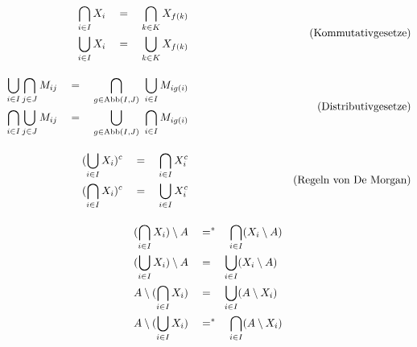 \begin{align*}
    \begin{split}
        \bigcap_{i\in I} X_i & \quad =\quad \bigcap_{k\in K} X_{f(k)} \\
        \bigcup_{i\in I} X_i & \quad =\quad \bigcup_{k\in K} X_{f(k)}
    \end{split} && (\text{Kommutativgesetze}) \\[1em]
    \begin{split}
        \bigcup_{i \in I} \bigcap_{j \in J} M_{ij} & \quad =\quad \bigcap_{g \in \Abb(I,J)}\ \bigcup_{i \in I} M_{ig(i)} \\ %
        \bigcap_{i \in I} \bigcup_{j \in J} M_{ij} & \quad =\quad \bigcup_{g \in \Abb(I,J)}\ \bigcap_{i \in I} M_{ig(i)} %
    \end{split} && (\text{Distributivgesetze}) \\[1em]
    \begin{split}
    (\bigcup_{i\in I} X_i)^c & \quad =\quad \bigcap_{i\in I} X_i^c \\
    (\bigcap_{i\in I} X_i)^c & \quad =\quad \bigcup_{i\in I} X_i^c
    \end{split} && (\text{Regeln von De Morgan}) \\[1em]
    (\bigcap_{i\in I} X_i) \setminus A & \quad =^* \quad \bigcap_{i\in I} (X_i \setminus A)  \\
    (\bigcup_{i\in I} X_i) \setminus A & \quad =\quad \bigcup_{i\in I} (X_i \setminus A) \\
    A \setminus (\bigcap_{i\in I} X_i) & \quad =\quad \bigcup_{i\in I}(A \setminus X_i) \\
    A \setminus (\bigcup_{i\in I} X_i) & \quad =^* \quad \bigcap_{i\in I}(A \setminus X_i)
\end{align*}





